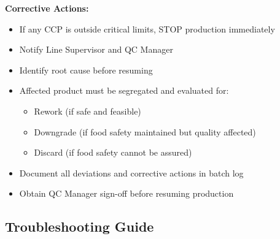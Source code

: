 {\vspace{1em}
\noindent\textbf{Corrective Actions:}
\begin{itemize}
\item If any CCP is outside critical limits, STOP production immediately
\item Notify Line Supervisor and QC Manager
\item Identify root cause before resuming
\item Affected product must be segregated and evaluated for:
  \begin{itemize}
  \item Rework (if safe and feasible)
  \item Downgrade (if 
food safety maintained but quality affected)
  \item Discard (if food safety cannot be assured)
  \end{itemize}
\item Document all deviations and corrective actions in batch log
\item Obtain QC Manager sign-off before resuming production
\end{itemize}


\subsection*{Troubleshooting Guide}

}
